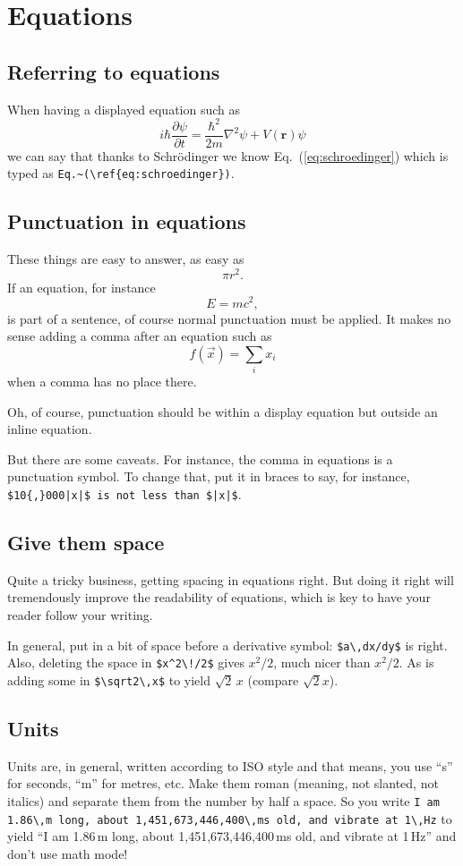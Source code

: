 \documentclass{article}
\begin{document}
\section{Equations}
\subsection{Referring to equations}\label{sec:refereq}
When having a displayed equation such as
\begin{equation}\label{eq:schroedinger}
i\hbar\frac{\partial\psi}{\partial t} = \frac{\hbar^2}{2m}\nabla^2\psi + V(\mathbf{r})\psi
\end{equation}
we can say that thanks to Schr\"odinger we know Eq.~(\ref{eq:schroedinger}) which
is typed as \verb+Eq.~(\ref{eq:schroedinger})+.

\subsection{Punctuation in equations}

These things are easy to answer, as easy as
$$ \pi r^2.$$
If an equation, for instance
$$ E = m c^2, $$
is part of a sentence, of course normal punctuation must be applied.  It makes no sense adding a comma after an equation such as 
$$ f(\vec x) = \sum_i x_i $$
when a comma has no place there.

Oh, of course, punctuation should be within a display equation but outside an inline equation.

But there are some caveats.  For instance, the comma in equations is a punctuation symbol.
To change that, put it in braces to say, for instance, \verb+$10{,}000|x|$ is not less than $|x|$+.

\subsection{Give them space}
Quite a tricky business, getting spacing in equations right.  But doing it right will tremendously
improve the readability of equations, which is key to have your reader follow your writing.

In general, put in a bit of space before a derivative symbol: \verb+$a\,dx/dy$+ is right.
Also, deleting the space in \verb+$x^2\!/2$+ gives $x^2\!/2$, much nicer than $x^2/2$.
As is adding some in \verb+$\sqrt2\,x$+ to yield $\sqrt2\,x$ (compare $\sqrt2x$).

\subsection{Units}
Units are, in general, written according to ISO style and that means, you use ``s'' for seconds, ``m'' for metres, etc.  Make them roman (meaning, not slanted, not italics) and separate them from the number by half a space.  So you write \verb+I am 1.86\,m long, about 1,451,673,446,400\,ms old, and vibrate at 1\,Hz+ to yield ``I am 1.86\,m long, about 1,451,673,446,400\,ms old, and vibrate at 1\,Hz'' and don't use math mode!  
\end{document}
